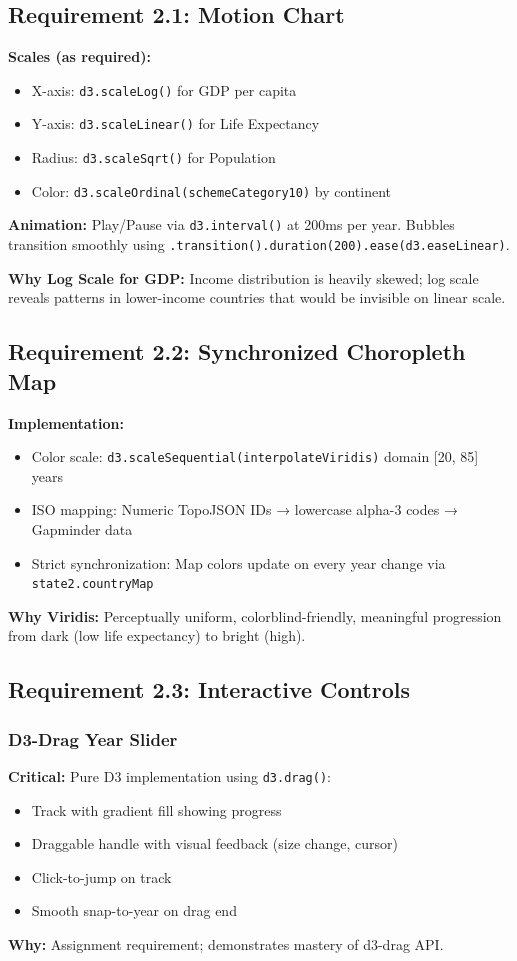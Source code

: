 \documentclass[11pt,a4paper]{article}
\begin{document}
\subsection{Requirement 2.1: Motion Chart}
\textbf{Scales (as required):}
\begin{itemize}[noitemsep]
    \item X-axis: \texttt{d3.scaleLog()} for GDP per capita
    \item Y-axis: \texttt{d3.scaleLinear()} for Life Expectancy
    \item Radius: \texttt{d3.scaleSqrt()} for Population
    \item Color: \texttt{d3.scaleOrdinal(schemeCategory10)} by continent
\end{itemize}
\textbf{Animation:} Play/Pause via \texttt{d3.interval()} at 200ms per year. Bubbles transition smoothly using \texttt{.transition().duration(200).ease(d3.easeLinear)}.

\textbf{Why Log Scale for GDP:} Income distribution is heavily skewed; log scale reveals patterns in lower-income countries that would be invisible on linear scale.

\subsection{Requirement 2.2: Synchronized Choropleth Map}
\textbf{Implementation:}
\begin{itemize}[noitemsep]
    \item Color scale: \texttt{d3.scaleSequential(interpolateViridis)} domain [20, 85] years
    \item ISO mapping: Numeric TopoJSON IDs → lowercase alpha-3 codes → Gapminder data
    \item Strict synchronization: Map colors update on every year change via \texttt{state2.countryMap}
\end{itemize}
\textbf{Why Viridis:} Perceptually uniform, colorblind-friendly, meaningful progression from dark (low life expectancy) to bright (high).

\subsection{Requirement 2.3: Interactive Controls}
\subsubsection{D3-Drag Year Slider}
\textbf{Critical:} Pure D3 implementation using \texttt{d3.drag()}:
\begin{itemize}[noitemsep]
    \item Track with gradient fill showing progress
    \item Draggable handle with visual feedback (size change, cursor)
    \item Click-to-jump on track
    \item Smooth snap-to-year on drag end
\end{itemize}
\textbf{Why:} Assignment requirement; demonstrates mastery of d3-drag API.
\end{document}
